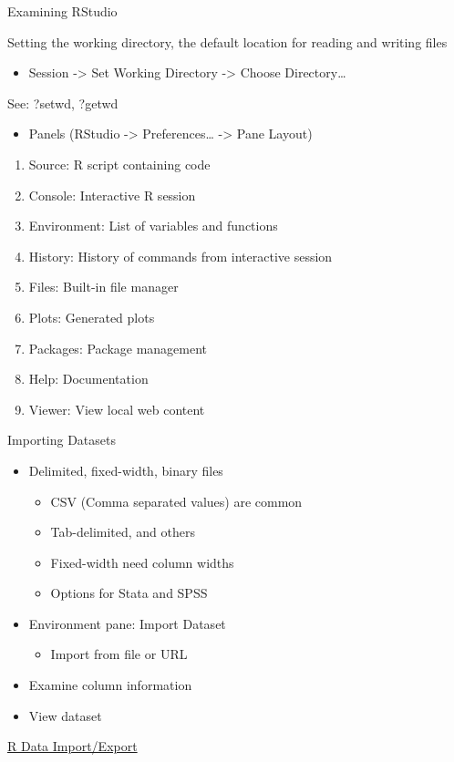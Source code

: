 \documentclass{beamer}
\begin{document}
\begin{frame}{Examining RStudio}

Setting the working directory, the default location for reading and writing files

\begin{itemize}
\item Session -\textgreater{} Set Working Directory -\textgreater{} Choose Directory\ldots{}
\end{itemize}

See: ?setwd, ?getwd

\begin{itemize}
\item Panels (RStudio -\textgreater{} Preferences\ldots{} -\textgreater{} Pane Layout)
\end{itemize}

\begin{enumerate}
\item Source: R script containing code
\item Console: Interactive R session
\item Environment: List of variables and functions
\item History: History of commands from interactive session
\item Files: Built-in file manager
\item Plots: Generated plots
\item Packages: Package management
\item Help: Documentation
\item Viewer: View local web content
\end{enumerate}

\end{frame}

\begin{frame}{Importing Datasets}

\begin{itemize}
\item Delimited, fixed-width, binary files

\begin{itemize}
\item CSV (Comma separated values) are common
\item Tab-delimited, and others
\item Fixed-width need column widths
\item Options for Stata and SPSS
\end{itemize}
\item Environment pane: Import Dataset

\begin{itemize}
\item Import from file or URL
\end{itemize}
\item Examine column information
\item View dataset
\end{itemize}

\href{http://cran.r-project.org/doc/manuals/r-release/R-data.html}{R Data Import/Export}

\end{frame}
\end{document}
